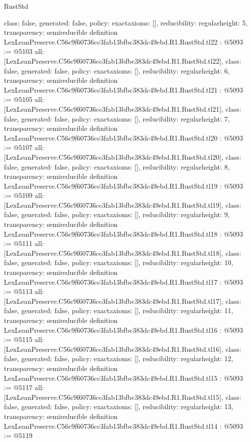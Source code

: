 \begin{lexlean}{RustStd}
\begin{coremodule}
{  class: false,
  generated: false,
  policy: exact{axioms: []},
  reducibility: regular{height: 5},
  transparency: semireducible
}
definition LexLeanPreserve.C56c9f60736cc3fab13bfbc383dc49ebd.R1.RustStd.tl22 : @5093 := @5103 {
  all: [LexLeanPreserve.C56c9f60736cc3fab13bfbc383dc49ebd.R1.RustStd.tl22],
  class: false,
  generated: false,
  policy: exact{axioms: []},
  reducibility: regular{height: 6},
  transparency: semireducible
}
definition LexLeanPreserve.C56c9f60736cc3fab13bfbc383dc49ebd.R1.RustStd.tl21 : @5093 := @5105 {
  all: [LexLeanPreserve.C56c9f60736cc3fab13bfbc383dc49ebd.R1.RustStd.tl21],
  class: false,
  generated: false,
  policy: exact{axioms: []},
  reducibility: regular{height: 7},
  transparency: semireducible
}
definition LexLeanPreserve.C56c9f60736cc3fab13bfbc383dc49ebd.R1.RustStd.tl20 : @5093 := @5107 {
  all: [LexLeanPreserve.C56c9f60736cc3fab13bfbc383dc49ebd.R1.RustStd.tl20],
  class: false,
  generated: false,
  policy: exact{axioms: []},
  reducibility: regular{height: 8},
  transparency: semireducible
}
definition LexLeanPreserve.C56c9f60736cc3fab13bfbc383dc49ebd.R1.RustStd.tl19 : @5093 := @5109 {
  all: [LexLeanPreserve.C56c9f60736cc3fab13bfbc383dc49ebd.R1.RustStd.tl19],
  class: false,
  generated: false,
  policy: exact{axioms: []},
  reducibility: regular{height: 9},
  transparency: semireducible
}
definition LexLeanPreserve.C56c9f60736cc3fab13bfbc383dc49ebd.R1.RustStd.tl18 : @5093 := @5111 {
  all: [LexLeanPreserve.C56c9f60736cc3fab13bfbc383dc49ebd.R1.RustStd.tl18],
  class: false,
  generated: false,
  policy: exact{axioms: []},
  reducibility: regular{height: 10},
  transparency: semireducible
}
definition LexLeanPreserve.C56c9f60736cc3fab13bfbc383dc49ebd.R1.RustStd.tl17 : @5093 := @5113 {
  all: [LexLeanPreserve.C56c9f60736cc3fab13bfbc383dc49ebd.R1.RustStd.tl17],
  class: false,
  generated: false,
  policy: exact{axioms: []},
  reducibility: regular{height: 11},
  transparency: semireducible
}
definition LexLeanPreserve.C56c9f60736cc3fab13bfbc383dc49ebd.R1.RustStd.tl16 : @5093 := @5115 {
  all: [LexLeanPreserve.C56c9f60736cc3fab13bfbc383dc49ebd.R1.RustStd.tl16],
  class: false,
  generated: false,
  policy: exact{axioms: []},
  reducibility: regular{height: 12},
  transparency: semireducible
}
definition LexLeanPreserve.C56c9f60736cc3fab13bfbc383dc49ebd.R1.RustStd.tl15 : @5093 := @5117 {
  all: [LexLeanPreserve.C56c9f60736cc3fab13bfbc383dc49ebd.R1.RustStd.tl15],
  class: false,
  generated: false,
  policy: exact{axioms: []},
  reducibility: regular{height: 13},
  transparency: semireducible
}
definition LexLeanPreserve.C56c9f60736cc3fab13bfbc383dc49ebd.R1.RustStd.tl14 : @5093 := @5119 {
}
\end{coremodule}
\end{lexlean}
